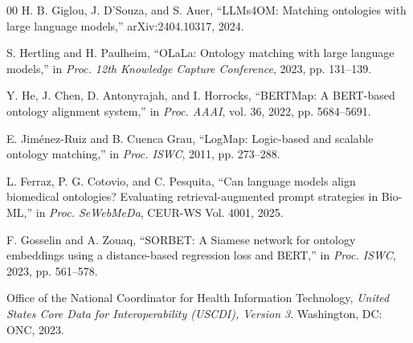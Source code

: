 \documentclass[conference]{IEEEtran}
\begin{document}
\begin{thebibliography}{00}
 H. B. Giglou, J. D'Souza, and S. Auer, ``LLMs4OM: Matching ontologies with large language models,'' arXiv:2404.10317, 2024.

 S. Hertling and H. Paulheim, ``OLaLa: Ontology matching with large language models,'' in \emph{Proc. 12th Knowledge Capture Conference}, 2023, pp. 131--139.

 Y. He, J. Chen, D. Antonyrajah, and I. Horrocks, ``BERTMap: A BERT-based ontology alignment system,'' in \emph{Proc. AAAI}, vol. 36, 2022, pp. 5684--5691.

 E. Jim\'enez-Ruiz and B. Cuenca Grau, ``LogMap: Logic-based and scalable ontology matching,'' in \emph{Proc. ISWC}, 2011, pp. 273--288.

 L. Ferraz, P. G. Cotovio, and C. Pesquita, ``Can language models align biomedical ontologies? Evaluating retrieval-augmented prompt strategies in Bio-ML,'' in \emph{Proc. SeWebMeDa}, CEUR-WS Vol. 4001, 2025.

 F. Gosselin and A. Zouaq, ``SORBET: A Siamese network for ontology embeddings using a distance-based regression loss and BERT,'' in \emph{Proc. ISWC}, 2023, pp. 561--578.

 Office of the National Coordinator for Health Information Technology, \emph{United States Core Data for Interoperability (USCDI), Version 3}. Washington, DC: ONC, 2023.

\end{thebibliography}
\end{document}
